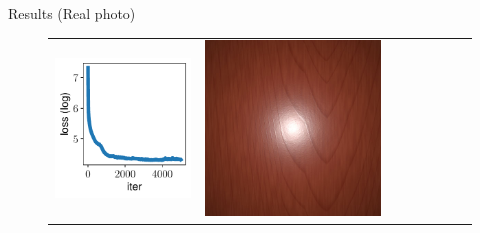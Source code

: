 \documentclass[final]{beamer}
\newlength{\twocolwid}
\newlength{\resultwidth}
\begin{document}
\begin{frame}[t]
\begin{columns}[t]
\begin{column}{\twocolwid}
\begin{block}{Results (Real photo)}
\begin{figure}[t]
\begin{tabular}{ccrclccc}
            		\includegraphics[width=\resultwidth]{images/real/wood/loss.pdf} &
            		\includegraphics[width=\resultwidth]{images/real/wood/optim.jpg} &

\end{tabular}
\end{figure}
\end{block}
\end{column}
\end{columns}
\end{frame}
\end{document}

